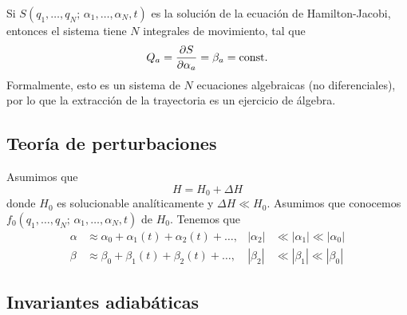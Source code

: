 \documentclass[]{article}
\numberwithin{equation}{section}
\begin{document}
Si $S(q_1,\ldots,q_N;\,\alpha_1,\ldots,\alpha_N,t)$ es la solución de la ecuación de Hamilton-Jacobi, entonces el sistema tiene $N$ integrales de movimiento, tal que
\begin{equation}
	Q_a = \dfrac{\partial S}{\partial \alpha_a} = \beta_a = \mathrm{const.}
\end{equation}
Formalmente, esto es un sistema de $N$ ecuaciones algebraicas (no diferenciales), por lo que la extracción de la trayectoria es un ejercicio de álgebra.

\subsection{Teoría de perturbaciones}
Asumimos que
\begin{equation}
	H = H_0 + \Delta H
\end{equation}
donde $H_0$ es solucionable analíticamente y $\Delta H \ll H_0$. Asumimos que conocemos $f_0 (q_1,\ldots,q_N;\,\alpha_1,\ldots,\alpha_N,t)$ de $H_0$. Tenemos que
\begin{align}
	\alpha &\approx \alpha_0 + \alpha_1(t) + \alpha_2(t) + \ldots, & |\alpha_2| &\ll |\alpha_1| \ll |\alpha_0|\\
	\beta &\approx \beta_0 + \beta_1(t) + \beta_2(t) + \ldots, & |\beta_2| &\ll |\beta_1| \ll |\beta_0|
\end{align}

\subsection{Invariantes adiabáticas}
\end{document}
